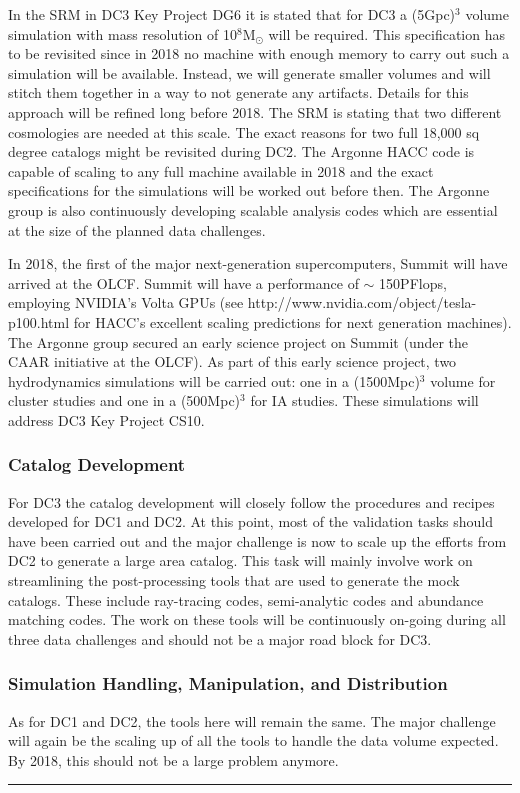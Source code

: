 In the SRM in DC3 Key Project DG6 it is stated that for DC3 a (5Gpc)$^3$ volume simulation with mass resolution of 10$^8$M$_\odot$ will be required. This specification has to be revisited since in 2018 no machine with enough memory to carry out such a simulation will be available. Instead, we will generate smaller volumes and will stitch them together in a way to not generate any artifacts. Details for this approach will be refined long before 2018. The SRM is stating that two different cosmologies are needed at this scale. The exact reasons for two full 18,000 sq degree catalogs might be revisited during DC2. The Argonne HACC code is capable of scaling to any full machine available in 2018 and the exact specifications for the simulations will be worked out before then. The Argonne group is also continuously developing scalable analysis codes which are essential at the size of the planned data challenges.

In 2018, the first of the major next-generation supercomputers, Summit will have arrived at the OLCF. Summit will have a performance of $\sim$ 150PFlops, employing NVIDIA's Volta GPUs (see http://www.nvidia.com/object/tesla-p100.html for HACC's excellent scaling predictions for next generation machines). The Argonne group secured an early science project on Summit (under the CAAR initiative at the OLCF). As part of this early science project, two hydrodynamics simulations will be carried out: one in a (1500Mpc)$^3$ volume for cluster studies and one in a (500Mpc)$^3$ for IA studies. These simulations will address DC3 Key Project CS10.

\subsubsection{Catalog Development}
\label{sec:keysims:dc3:dev}

For DC3 the catalog development will closely follow the procedures and recipes developed for DC1 and DC2. At this point, most of the validation tasks should have been carried out and the major challenge is now to scale up the efforts from DC2 to generate a large area catalog. This task will mainly involve work on streamlining the post-processing tools that are used to generate the mock catalogs. These include ray-tracing codes, semi-analytic codes and abundance matching codes. The work on these tools will be continuously on-going during all three data challenges and should not be a major road block for DC3.

\subsubsection{Simulation Handling, Manipulation, and Distribution}
\label{sec:keysims:dc3:handling}

As for DC1 and DC2, the tools here will remain the same. The major challenge will again be the scaling up of all the tools to handle the data volume expected. By 2018, this should not be a large problem anymore.


\vspace{\baselineskip}
\hrule
\clearpage
